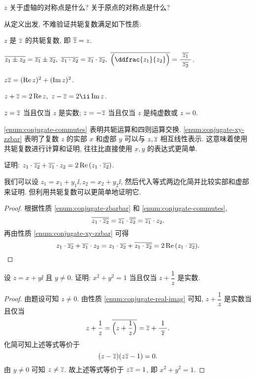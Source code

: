 \begin{exercise}
  $z$ 关于虚轴的对称点是什么? 关于原点的对称点是什么?
\end{exercise}

从定义出发, 不难验证共轭复数满足如下性质:
\begin{enuma}
  \item $z$ 是 $\overline z$ 的共轭复数, 即 $\overline{\overline z}=z$.
  \label{enum:conjugate-zbarbar}
  \item $\ov{z_1\pm z_2}=\ov{z_1}\pm\ov{z_2},\ 
  \ov{z_1\cdot z_2}=\ov{z_1}\cdot\ov{z_2},\ 
  \ov{\Bigl(\ddfrac{z_1}{z_2}\Bigr)}=\dfrac{~\ov{z_1}~}{~\ov{z_2}~}$.
  \label{enum:conjugate-commutes}
  \item $z\overline{z}=(\operatorname{Re} z)^2+(\operatorname{Im} z)^2$.
  \item $z+\ov z=2\Re z,\ z-\ov z=2\ii\Im z$.
  \label{enum:conjugate-xy-zzbar}
  \item $z=\overline z$ 当且仅当 $z$ 是实数; $z=-\overline z$ 当且仅当 $z$ 是纯虚数或 $z=0$.
  \label{enum:conjugate-real-imag}
\end{enuma}

\ref{enum:conjugate-commutes} 表明共轭运算和四则运算交换.
\ref{enum:conjugate-xy-zzbar} 表明了复数 $z$ 的实部 $x$ 和虚部 $y$ 可以与 $z,\overline z$ 相互线性表示.
这意味着使用共轭复数进行计算和证明, 往往比直接使用 $x,y$ 的表达式更简单.

\begin{example}
  证明: $z_1\cdot\overline{z_2}+\overline{z_1}\cdot z_2=2\operatorname{Re}{(z_1\cdot\overline{z_2})}$.
\end{example}

我们可以设 $z_1=x_1+y_1\ii,z_2=x_2+y_2\ii$, 然后代入等式两边化简并比较实部和虚部来证明.
但利用共轭复数可以更简单地证明它.

\begin{proof}
  根据性质 \ref{enum:conjugate-zbarbar} 和 \ref{enum:conjugate-commutes},
  \[
     \overline{z_1\cdot\overline{z_2}}
    =\overline{z_1}\cdot\overline{\overline{z_2}}
    =\overline{z_1}\cdot z_2.
  \]
  再由性质 \ref{enum:conjugate-xy-zzbar} 可得
  \[
     z_1\cdot\overline{z_2}+\overline{z_1}\cdot z_2
    =z_1\cdot\overline{z_2}+\overline{z_1\cdot\overline{z_2}}
    =2\operatorname{Re}{(z_1\cdot\overline{z_2})}.
  \]
\end{proof}

\begin{example}
  设 $z=x+y\ii$ 且 $y\neq 0$. 证明: $x^2+y^2=1$ 当且仅当 $z+\dfrac1z$ 是实数.
\end{example}
\begin{proof}
  由题设可知 $z\neq 0$.
  由性质 \ref{enum:conjugate-real-imag} 可知, 
  $z+\dfrac1z$ 是实数当且仅当
  \[
     z+\frac1z
    =\overline{\Bigl(z+\frac1z\Bigr)}
    =\overline z+\frac1{~\overline z~}.
  \]
  化简可知上述等式等价于
  \[
    (z-\overline z)(z\overline z-1)=0.
  \]
  由 $y\neq0$ 可知 $z\neq \overline z$.
  故上述等式等价于 $z\overline z=1$, 即 $x^2+y^2=1$.
\end{proof}

